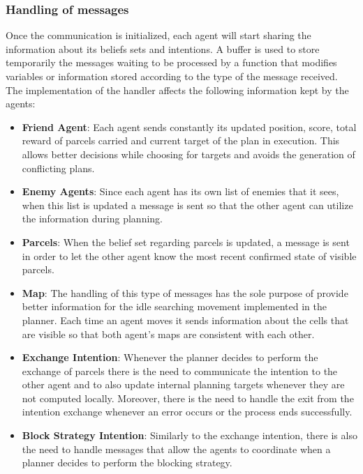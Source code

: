 \documentclass[a4paper, 11pt]{article}
\begin{document}
\subsubsection{Handling of messages}
Once the communication is initialized, each agent will start sharing the information about its beliefs sets and intentions. A buffer is used to store temporarily the messages waiting to be processed by a function that modifies variables or information stored according to the type of the message received. The implementation of the handler affects the following information kept by the agents:
\begin{itemize}
\item \textbf{Friend Agent}: Each agent sends constantly its updated position, score, total reward of parcels carried and current target of the plan in execution. This allows better decisions while choosing for targets and avoids the generation of conflicting plans.
\item \textbf{Enemy Agents}: Since each agent has its own list of enemies that it sees, when this list is updated a message is sent so that the other agent can utilize the information during planning.
\item \textbf{Parcels}: When the belief set regarding parcels is updated, a message is sent in order to let the other agent know the most recent confirmed state of visible parcels.
\item \textbf{Map}: The handling of this type of messages has the sole purpose of provide better information for the idle searching movement implemented in the planner. Each time an agent moves it sends information about the cells that are visible so that both agent's maps are consistent with each other.
\item \textbf{Exchange Intention}: Whenever the planner decides to perform the exchange of parcels there is the need to communicate the intention to the other agent and to also update internal planning targets whenever they are not computed locally. Moreover, there is the need to handle the exit from the intention exchange whenever an error occurs or the process ends successfully.
\item \textbf{Block Strategy Intention}: Similarly to the exchange intention, there is also the need to handle messages that allow the agents to coordinate when a planner decides to perform the blocking strategy.
\end{itemize}
\end{document}
